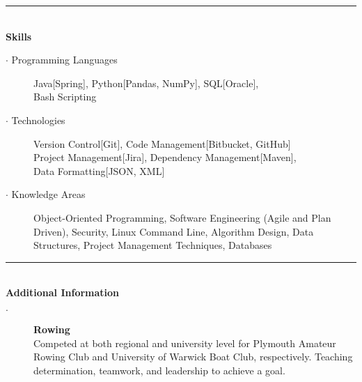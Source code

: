 \documentclass[12pt, a4paper]{article}
\begin{document}
\vspace{-2ex}
\noindent\rule{8cm}{0.4pt} \\
\textbf{Skills}
  \begin{description}
    \item[$\cdot$ Programming Languages]  Java[Spring],
        Python[Pandas, NumPy],
        SQL[Oracle],
        \\Bash Scripting
    \item[$\cdot$ Technologies] Version Control[Git],
        Code Management[Bitbucket, GitHub]
        \\Project Management[Jira],
        Dependency Management[Maven],
        \\Data Formatting[JSON, XML]
    \item[$\cdot$ Knowledge Areas] Object-Oriented Programming,
		Software Engineering (Agile and Plan Driven),
	    Security,
	    Linux Command Line,
        Algorithm Design,
        Data Structures,
        Project Management Techniques,
        Databases
  \end{description}

\vspace{-2ex}
\noindent\rule{8cm}{0.4pt} \\
\textbf{Additional Information}
  \begin{description}
    \item[$\cdot$] \textbf{Rowing} \\Competed at both regional and university level for Plymouth Amateur Rowing Club and University of Warwick Boat Club, respectively.
    Teaching determination, teamwork, and leadership to achieve a goal.

    \iffalse
    Rowing has taught me the value of team work, and has given me transferable skills including resilience, decision-making, and precision, all of which I bring to the workplace.
    Time management $\cdot$ Team work $\cdot$ Resilience $\cdot$ Motivational skills $\cdot$ Quick thinking \\ $\cdot$ Technical planning $\cdot$ Precision
    \fi

  \end{description}
\end{document}
